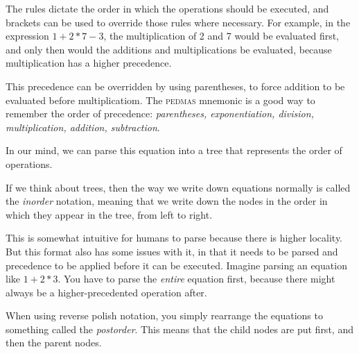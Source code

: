 \documentclass[a4paper,twocolumn]{article}
\begin{document}
The rules dictate the order in which the operations should be executed, and brackets can be used to override those rules where necessary. For example, in the expression $1 + 2 * 7 - 3$, the multiplication of 2 and 7 would be evaluated first, and only then would the additions and multiplications be evaluated, because multiplication has a higher precedence.

This precedence can be overridden by using parentheses, to force addition to be evaluated before multiplicatiom. The \textsc{pedmas} mnemonic is a good way to remember the order of precedence: \emph{parentheses, exponentiation, division, multiplication, addition, subtraction}. 

In our mind, we can parse this equation into a tree that represents the order of operations.

\begin{center}
\end{center}

If we think about trees, then the way we write down equations normally is called the \emph{inorder} notation, meaning that we write down the nodes in the order in which they appear in the tree, from left to right.

\begin{center}
\end{center}

This is somewhat intuitive for humans to parse because there is higher locality. But this format also has some issues with it, in that it needs to be parsed and precedence to be applied before it can be executed. Imagine parsing an equation like $1 + 2 * 3$. You have to parse the \emph{entire} equation first, because there might always be a higher-precedented operation after.

When using reverse polish notation, you simply rearrange the equations to something called the \emph{postorder}. This means that the child nodes are put first, and then the parent nodes.

\begin{center}
\end{center}
\end{document}
